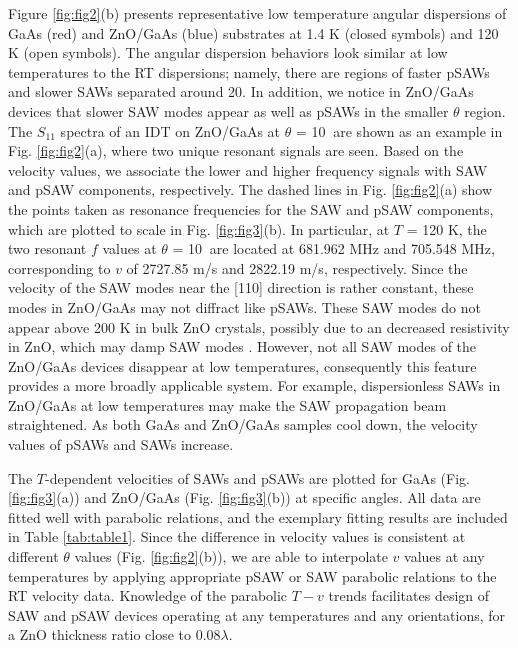 \documentclass[aps,prb,amsmath,amssymb,footinbib,showpacs,superscriptaddress]{revtex4-1}%
\begin{document}
Figure \ref{fig:fig2}(b) presents representative low temperature angular dispersions of GaAs (red) and ZnO/GaAs (blue) substrates at 1.4 K (closed symbols) and 120 K (open symbols). The angular dispersion behaviors look similar at low temperatures to the RT dispersions; namely, there are regions of faster pSAWs and slower SAWs separated around 20\textdegree. In addition, we notice in ZnO/GaAs devices that slower SAW modes appear as well as pSAWs in the smaller $\theta$ region. The $S_{11}$ spectra of an IDT on ZnO/GaAs at $\theta$ = 10\textdegree$\>$ are shown as an example in Fig. \ref{fig:fig2}(a), where two unique resonant signals are seen. Based on the velocity values, we associate the lower and higher frequency signals with SAW and pSAW components, respectively. The dashed lines in Fig. \ref{fig:fig2}(a) show the points taken as resonance frequencies for the SAW and pSAW components, which are plotted to scale in Fig. \ref{fig:fig3}(b). In particular, at $T$ = 120 K, the two resonant $f$ values at $\theta$ = 10\textdegree$\>$ are located at 681.962 MHz and 705.548 MHz, corresponding to $v$ of 2727.85 m/s and 2822.19 m/s, respectively.  Since the velocity of the SAW modes near the [110] direction is rather constant, these modes in ZnO/GaAs may not diffract like pSAWs. These SAW modes do not appear above 200 K in bulk ZnO crystals, possibly due to an decreased resistivity in ZnO, which may damp SAW modes \cite{Magnusson2015}. However, not all SAW modes of the ZnO/GaAs devices disappear at low temperatures, consequently this feature provides a more broadly applicable system. For example, dispersionless SAWs in ZnO/GaAs at low temperatures may make the SAW propagation beam straightened. As both GaAs and ZnO/GaAs samples cool down, the velocity values of pSAWs and SAWs increase. 

The $T$-dependent velocities of SAWs and pSAWs are plotted for GaAs (Fig. \ref{fig:fig3}(a)) and ZnO/GaAs (Fig. \ref{fig:fig3}(b)) at specific angles. All data are fitted well with parabolic relations, and the exemplary fitting results are included in Table \ref{tab:table1}. Since the difference in velocity values is consistent at different $\theta$ values (Fig. \ref{fig:fig2}(b)), we are able to interpolate $v$ values at any temperatures by applying appropriate pSAW or SAW parabolic relations to the RT velocity data. Knowledge of the parabolic $T-v$ trends facilitates  design of SAW and pSAW devices operating at any temperatures and any orientations, for a ZnO thickness ratio close to 0.08$\lambda$.
\end{document}
